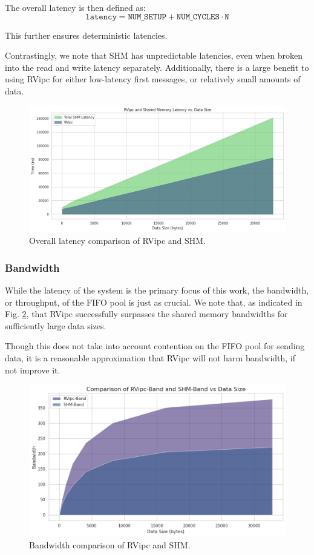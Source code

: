 The overall latency is then defined as:
\begin{equation}
  \texttt{latency} = \texttt{NUM\_SETUP} + \texttt{NUM\_CYCLES} \cdot \texttt{N}
\end{equation}

This further ensures deterministic latencies. 

Contrastingly, we note that SHM has unpredictable latencies, even when broken into the read and write latency separately. Additionally, there is a large benefit to using RVipc for either low-latency first messages, or relatively small amounts of data. 

\begin{figure}[h]
  \centering
  \includegraphics[width=1\linewidth]{figures/lat-v-dat.png}
  \caption{Overall latency comparison of RVipc and SHM.}
  \label{fig:overall_latency}
\end{figure}

\subsubsection{Bandwidth}
While the latency of the system is the primary focus of this work, the bandwidth, or throughput, of the FIFO pool is just as crucial. We note that, as indicated in Fig. \ref{fig:bandwidth}, that RVipc successfully surpasses the shared memory bandwidths for sufficiently large data sizes.

Though this does not take into account contention on the FIFO pool for sending data, it is a reasonable approximation that RVipc will not harm bandwidth, if not improve it.

\begin{figure}[h]
  \centering
  \includegraphics[width=1\linewidth]{figures/band-v-dat.png}
  \caption{Bandwidth comparison of RVipc and SHM.}
  \label{fig:bandwidth}
\end{figure}

